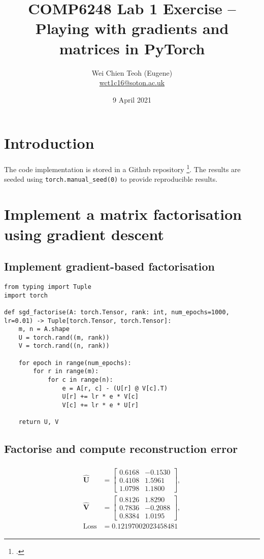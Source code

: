 \documentclass[10pt, twocolumn]{article}
\title{\Large COMP6248 Lab 1 Exercise -- Playing with gradients and matrices in PyTorch}
\author{\Large Wei Chien Teoh (Eugene)\\\bigskip \href{mailto:wct1c16@soton.ac.uk}{wct1c16@soton.ac.uk}}
\date{\large 9 April 2021}
\begin{document}
\maketitle

\section*{Introduction}

The code implementation is stored in a Github repository \footcite{github}. The results are seeded using \lstinline{torch.manual_seed(0)} to provide reproducible results.

\section{Implement a matrix factorisation using gradient descent}

\subsection{Implement gradient-based factorisation}

\begin{lstlisting}
from typing import Tuple
import torch

def sgd_factorise(A: torch.Tensor, rank: int, num_epochs=1000, lr=0.01) -> Tuple[torch.Tensor, torch.Tensor]:
    m, n = A.shape
    U = torch.rand((m, rank))
    V = torch.rand((n, rank)) 

    for epoch in range(num_epochs):
        for r in range(m):
            for c in range(n):
                e = A[r, c] - (U[r] @ V[c].T)
                U[r] += lr * e * V[c]
                V[c] += lr * e * U[r]

    return U, V
\end{lstlisting}

\subsection{Factorise and compute reconstruction error} \label{sec:reconstruction}

\begin{align*}
    \begin{split}
    \hat{\pmb{U}} &= 
    \begin{bmatrix}
        0.6168 & -0.1530\\
        0.4108 &  1.5961\\
        1.0798 &  1.1800
    \end{bmatrix},\\
    \hat{\pmb{V}} &= 
    \begin{bmatrix}
        0.8126 &  1.8290\\
        0.7836 & -0.2088\\
        0.8384 & 1.0195
    \end{bmatrix},\\
    \text{Loss} &= 0.12197002023458481
    \end{split}
\end{align*}
\end{document}
